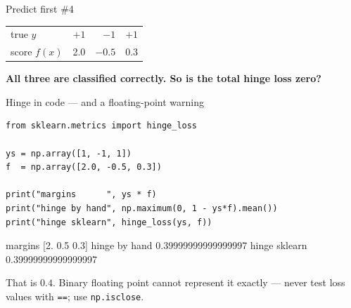 \documentclass[aspectratio=169]{beamer}
\begin{document}
\begin{frame}{Predict first \#4}
  \begin{center}
  \begin{tabular}{@{}lrrr@{}}
    \toprule
    true $y$     & $+1$ & $-1$ & $+1$\\
    score $f(x)$ & 2.0  & $-0.5$ & 0.3\\
    \bottomrule
  \end{tabular}
  \end{center}
  \vspace{0.5em}
  \begin{center}
    \textbf{All three are classified correctly. So is the total hinge loss
    zero?}
  \end{center}
  \vspace{0.6em}
\end{frame}

\begin{frame}[fragile]{Hinge in code --- and a floating-point warning}
\begin{lstlisting}
from sklearn.metrics import hinge_loss

ys = np.array([1, -1, 1])
f  = np.array([2.0, -0.5, 0.3])

print("margins      ", ys * f)
print("hinge by hand", np.maximum(0, 1 - ys*f).mean())
print("hinge sklearn", hinge_loss(ys, f))
\end{lstlisting}
\begin{outblk}
margins       [2.  0.5 0.3]
hinge by hand 0.39999999999999997
hinge sklearn 0.39999999999999997
\end{outblk}
\begin{center}\small
  That is $0.4$. Binary floating point cannot represent it exactly --- never
  test loss values with \texttt{==}; use \texttt{np.isclose}.
\end{center}
\end{frame}
\end{document}
